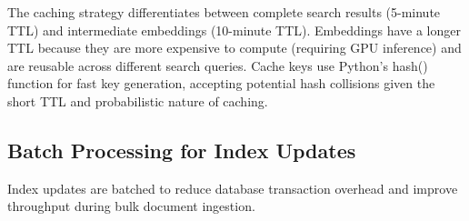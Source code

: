 The caching strategy differentiates between complete search results (5-minute TTL) and intermediate embeddings (10-minute TTL). Embeddings have a longer TTL because they are more expensive to compute (requiring GPU inference) and are reusable across different search queries. Cache keys use Python's hash() function for fast key generation, accepting potential hash collisions given the short TTL and probabilistic nature of caching.

\subsection{Batch Processing for Index Updates}

Index updates are batched to reduce database transaction overhead and improve throughput during bulk document ingestion.


